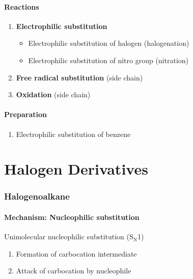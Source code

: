 \documentclass[12pt,a4 paper]{article}
\begin{document}
\subsection{Reactions}
\begin{enumerate}
\item \textbf{Electrophilic substitution}
	\begin{itemize}
	\item Electrophilic substitution of halogen (halogenation)
	\item Electrophilic substitution of nitro group (nitration)
	\end{itemize}
\item \textbf{Free radical substitution} (side chain)
\item \textbf{Oxidation} (side chain)
\end{enumerate}

\subsection{Preparation}
\begin{enumerate}
\item Electrophilic substitution of benzene
\end{enumerate}
\pagebreak

\part{Halogen Derivatives}
\section{Halogenoalkane}
\subsection{Mechanism: Nucleophilic substitution}
\begin{mechanism}{Unimolecular nucleophilic substitution (S$_\text{N}$1)}{}
\begin{enumerate}[leftmargin=0.65in,label=\textbf{Step \arabic*:}]
\item Formation of carbocation intermediate


\item Attack of carbocation by nucleophile
\end{enumerate}
\end{mechanism}
\end{document}

